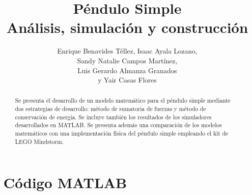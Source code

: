 \documentclass[letterpaper, 12pt]{article}
\begin{document}
\title{
Péndulo Simple\\
Análisis, simulación y construcción\\
}


\author{
    Enrique Benavides Téllez, Isaac Ayala Lozano,\\ 
    Sandy Natalie Campos Martínez,\\
    Luis Gerardo Almanza Granados\\
    y Yair Casas Flores
}

\date{}

\maketitle

\begin{abstract}



Se presenta el desarrollo de un modelo matemático
para el péndulo simple mediante dos estrategias de desarrollo:
método de sumatoria de fuerzas y método de conservación de energía.
Se incluye también los resultados de los simuladores desarrollados 
en MATLAB.
Se presenta además una comparación de los modelos matemáticos 
con una implementación física del péndulo simple empleando el 
kit de LEGO Mindstorm.

\end{abstract}








% 



\clearpage
% 
\printbibliography{}

\pagebreak

\appendix
\section{Código MATLAB}


%
\end{document}
